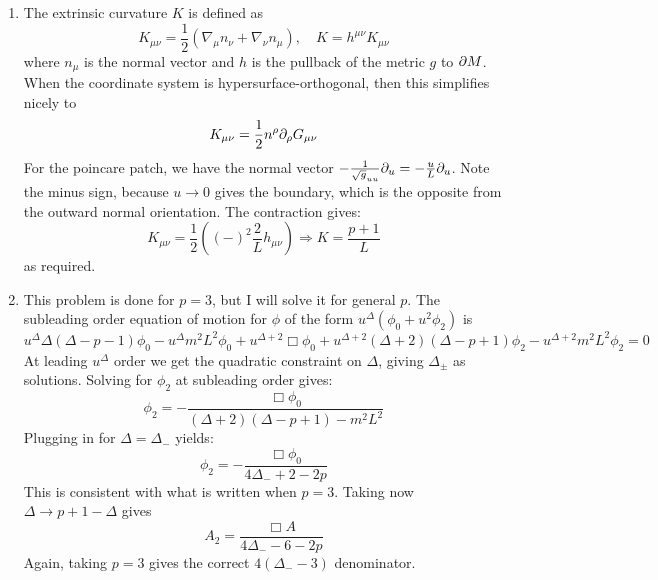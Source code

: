 \documentclass[11pt, class=article, crop=false]{standalone}
\begin{document}
\begin{enumerate}
	It is worth noting that there is another very clean way to obtain this propagator, as originally written in Witten's paper. Take the delta function source to be at $u = \infty$ and let's look for a solution of the massive wave equation. Because the source is at $\infty$ the solution has full symmetry under translations in $x$, and so can only depend on $u$. The equations of motion are:
	\[
		\d_u u^{-p - 2} u^{2} \d_u \phi(u) - m^2 L^2 \phi = 0 \Rightarrow \phi(u) = u^\Delta, \quad \Delta (\Delta - p - 1) = m^2 L^2
	\]
	this gives the correct $\Delta_{\pm}$ as required. To relate this to our solution for a $\delta$ function at $0$ we must do an inversion, which consists of taking $u, x \to \frac{u, x}{u^2 + |x|^2}$ yielding our desired propagator. 
	
	\item The extrinsic curvature $K$ is defined as
	\[
		K_{\mu \nu} = \frac12 (\nabla_\mu n_\nu + \nabla_\nu n_\mu), \quad K = h^{\mu \nu} K_{\mu \nu}
	\]
	where $n_\mu$ is the normal vector and $h$ is the pullback of the metric $g$ to $\partial M$. When the coordinate system is hypersurface-orthogonal, then this simplifies nicely to 
	\[
		K_{\mu \nu} = \frac12 n^\rho \partial_\rho G_{\mu \nu}
	\]
	For the poincare patch, we have the normal vector $-\frac{1}{\sqrt g_{uu} }\partial_u = -\frac{u}{L} \partial_u$. Note the minus sign, because $u \to 0$ gives the boundary, which is the opposite from the outward normal orientation. The contraction gives:
	\[
		K_{\mu \nu} = \frac12 ((-)^2 \frac{2}{L} h_{\mu \nu}) \Rightarrow K = \frac{p+1}{L}
	\]
	as required.
	
	\item This problem is done for $p=3$, but I will solve it for general $p$. The subleading order equation of motion for $\phi$ of the form $u^{\Delta} (\phi_0 + u^2 \phi_2)$ is
	\[
		u^\Delta \Delta (\Delta -p-1) \phi_0 -  u^{\Delta} m^2 L^2 \phi_0 + u^{\Delta + 2} \Box \phi_0  + u^{\Delta + 2} (\Delta+2) (\Delta - p + 1)  \phi_2 - u^{\Delta + 2} m^2 L^2 \phi_2 = 0
	\]
	At leading $u^{\Delta}$ order we get the quadratic constraint on $\Delta$, giving $\Delta_\pm$ as solutions. Solving for $\phi_2$ at subleading order gives:
	\[
		\phi_2 = - \frac{\Box \phi_0}{(\Delta+2)(\Delta-p+1) - m^2 L^2}
	\]
	Plugging in for $\Delta = \Delta_-$ yields:
	\[
		\phi_2 = - \frac{\Box \phi_0}{4 \Delta_- + 2 - 2p}
	\]
	This is consistent with what is written when $p=3$. Taking now $\Delta \to p+1 - \Delta$ gives
	\[
		A_2 = \frac{\Box A}{4 \Delta_- - 6 - 2 p}
	\]
	Again, taking $p = 3$ gives the correct $4 (\Delta_- - 3)$ denominator.
	

\end{enumerate}
\end{document}

